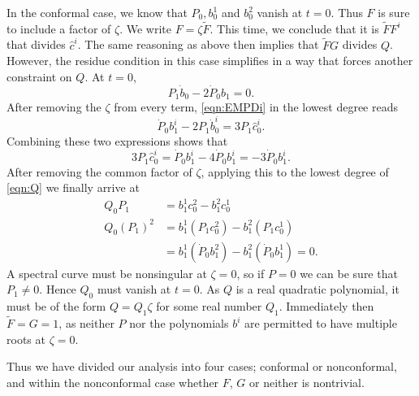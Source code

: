 In the conformal case, we know that $P_0, b^1_0$ and $b^2_0$ vanish at $t=0$. Thus $F$ is sure to include a factor of $ζ$. We write $F = ζ\tilde{F}$. This time, we conclude that it is $\tilde{F}F^i$ that divides $\hat{c}^i$. The same reasoning as above then implies that $\tilde{F}G$ divides $Q$. However, the residue condition in this case simplifies in a way that forces another constraint on $Q$. At $t=0$,
\[
P_1 \dot{b}_0 - 2 \dot{P}_0 b_1 = 0.
\]
After removing the $ζ$ from every term, \eqref{eqn:EMPDi} in the lowest degree reads
\[
\dot P_0 b_1^i - 2P_1\dot b_0^i = 3P_1\hat{c}_0^i.
\]
Combining these two expressions shows that
\[
3P_1\hat{c}_0^i = \dot P_0 b_1^i - 4\dot{P}_0 b_1^i = -3\dot{P}_0 b_1^i.
\]
After removing the common factor of $ζ$, applying this to the lowest degree of \eqref{eqn:Q} we finally arrive at
\begin{align*}
Q_0 P_1 &= b^1_1 c^2_0 - b^2_1 c^1_0 \\
Q_0 (P_1)^2 &= b^1_1 (P_1 c^2_0) - b^2_1 (P_1 c^1_0) \\
&= b^1_1 (\dot{P}_0 b^2_1) - b^2_1 (\dot{P}_0 b^1_1) = 0.
\end{align*}
A spectral curve must be nonsingular at $ζ=0$, so if $P=0$ we can be sure that $P_1\neq 0$. Hence $Q_0$ must vanish at $t=0$. As $Q$ is a real quadratic polynomial, it must be of the form $Q=Q_1 ζ$ for some real number $Q_1$. Immediately then $\tilde{F} = G = 1$, as neither $P$ nor the polynomials $b^i$ are permitted to have multiple roots at $ζ=0$.

Thus we have divided our analysis into four cases; conformal or nonconformal, and within the nonconformal case whether $F$, $G$ or neither is nontrivial.


